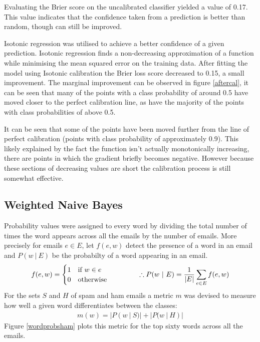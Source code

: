 \documentclass[12pt, a4paper]{article}
\begin{document}
	Evaluating the Brier score on the uncalibrated classifier yielded a value of 0.17. This value indicates that the confidence taken from a prediction is better than random, though can still be improved.

	Isotonic regression was utilised to achieve a better confidence of a given prediction. Isotonic regression finds a non-decreasing approximation of a function while minimising the mean squared error on the training data. After fitting the model using Isotonic calibration the Brier loss score decreased to 0.15, a small improvement. The marginal improvement can be observed in figure \ref{aftercal}, it can be seen that many of the points with a class probability of around 0.5 have moved closer to the perfect calibration line, as have the majority of the points with class probabilities of above 0.5.

	It can be seen that some of the points have been moved further from the line of perfect calibration (points with class probability of approximately 0.9). This likely explained by the fact the function isn't actually monotonically increasing, there are points in which the gradient briefly becomes negative. However because these sections of decreasing values are short the calibration process is still somewhat effective.

  \subsection{Weighted Naive Bayes}

  Probability values were assigned to every word by dividing the total number of times the word appears across all the emails by the number of emails. More precisely for emails $e \in E$, let $f(e, w)$ detect the presence of a word in an email and $P(w\ |\ E)$ be the probabilty of a word appearing in an email.
  \vspace{-0.1cm}
  \begin{align*}
    f(e, w) = \begin{cases}
      1   & \text{if } w \in e \\
      0   & \text{otherwise}
    \end{cases}
		\hspace{1.5cm}
    \therefore P(w\ |\ E) = \frac{1}{|E|}\sum_{e \in E}{f(e, w)}
  \end{align*}
  For the sets $S$ and $H$ of spam and ham emails a metric $m$ was devised to measure how well a given word differentiates between the classes:
  \vspace{-0.1cm}
  \begin{align*}
    m(w) = |P(w\ |\ S)| + |P(w\ |\ H)|
  \end{align*}
  Figure \ref{wordprobsham} plots this metric for the top sixty words across all the emails.
\end{document}
